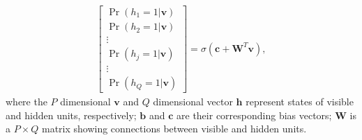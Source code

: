 \documentclass[11pt]{article}
\newcommand{\vb}{\boldsymbol{b}}
\newcommand{\vc}{\boldsymbol{c}}
\newcommand{\vh}{\boldsymbol{h}}
\newcommand{\vv}{\boldsymbol{v}}
\newcommand{\mw}{\boldsymbol{W}}
\begin{document}
{\begin{framedbox}[h]
\begin{minipage}{1.0\linewidth}
\begin{align*}
      \begin{bmatrix}
        \Pr(h_1=1|\vv) \\
        \Pr(h_2=1|\vv) \\
        \vdots \\
        \Pr(h_j=1|\vv) \\
        \vdots \\
        \Pr(h_Q=1|\vv)
      \end{bmatrix} = \sigma(\vc + \mw^T\vv),
    \end{align*}
    where the $P$ dimensional $\vv$ and $Q$ dimensional vector $\vh$ represent states of visible and hidden units, respectively; $\vb$ and $\vc$ are their corresponding bias vectors; $\mw$ is a $P \times Q$
    matrix showing connections between visible and hidden units.
  \end{minipage}
\end{framedbox}
}
\end{document}
